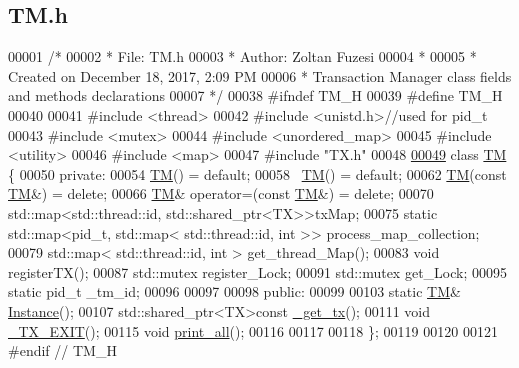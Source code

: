\hypertarget{_t_m_8h_source}{}\subsection{T\+M.\+h}

\begin{DoxyCode}
00001 \textcolor{comment}{/* }
00002 \textcolor{comment}{ * File:   TM.h}
00003 \textcolor{comment}{ * Author: Zoltan Fuzesi}
00004 \textcolor{comment}{ * }
00005 \textcolor{comment}{ * Created on December 18, 2017, 2:09 PM}
00006 \textcolor{comment}{ * Transaction Manager class fields and methods declarations}
00007 \textcolor{comment}{ */}
00038 \textcolor{preprocessor}{#ifndef TM\_H}
00039 \textcolor{preprocessor}{#define TM\_H}
00040 
00041 \textcolor{preprocessor}{#include <thread>}
00042 \textcolor{preprocessor}{#include <unistd.h>}\textcolor{comment}{//used for pid\_t}
00043 \textcolor{preprocessor}{#include <mutex>}
00044 \textcolor{preprocessor}{#include <unordered\_map>}
00045 \textcolor{preprocessor}{#include <utility>}
00046 \textcolor{preprocessor}{#include <map>}
00047 \textcolor{preprocessor}{#include "TX.h"}
00048 
\hypertarget{_t_m_8h_source.tex_l00049}{}\hyperlink{class_t_m}{00049} \textcolor{keyword}{class }\hyperlink{class_t_m}{TM} \{
00050 \textcolor{keyword}{private}:
00054     \hyperlink{class_t_m}{TM}() = \textcolor{keywordflow}{default}; 
00058     ~\hyperlink{class_t_m}{TM}() = \textcolor{keywordflow}{default};
00062     \hyperlink{class_t_m}{TM}(\textcolor{keyword}{const} \hyperlink{class_t_m}{TM}&) = \textcolor{keyword}{delete}; 
00066     \hyperlink{class_t_m}{TM}& operator=(\textcolor{keyword}{const} \hyperlink{class_t_m}{TM}&) = \textcolor{keyword}{delete}; 
00070     std::map<std::thread::id, std::shared\_ptr<TX>>txMap;
00075     \textcolor{keyword}{static} std::map<pid\_t, std::map< std::thread::id, int >> process\_map\_collection;
00079     std::map< std::thread::id, int > get\_thread\_Map();
00083     \textcolor{keywordtype}{void} registerTX(); 
00087     std::mutex register\_Lock;
00091     std::mutex get\_Lock;
00095     \textcolor{keyword}{static} pid\_t \_tm\_id;
00096 
00097 
00098 \textcolor{keyword}{public}:
00099 
00103     \textcolor{keyword}{static} \hyperlink{class_t_m}{TM}& \hyperlink{class_t_m_a7ce5f35e0dae76df4fe116cf905bbe60}{Instance}();
00107     std::shared\_ptr<TX>\textcolor{keyword}{const} \hyperlink{class_t_m_a41cb0226cc4080c931651b13f74a0075}{\_get\_tx}(); 
00111     \textcolor{keywordtype}{void} \hyperlink{class_t_m_a5e2d1127f2429f2f524d25f430eade06}{\_TX\_EXIT}();
00115     \textcolor{keywordtype}{void} \hyperlink{class_t_m_a1d6891b1d3e71cc0acef54e7afe71c09}{print\_all}();
00116     
00117 
00118 \};
00119 
00120 
00121 \textcolor{preprocessor}{#endif // TM\_H}
\end{DoxyCode}
